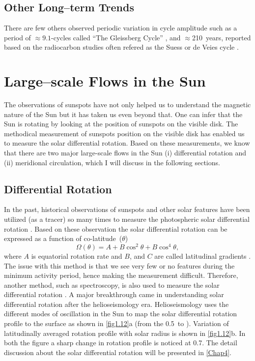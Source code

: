 \subsection{Other Long--term Trends}
There are few others observed periodic variation in cycle amplitude such as a period of $\approx9.1$-cycles called ``The Gleissberg Cycle'' \citep{Gleissberg1939, Hathaway2015, Usoskin2013}, and $\approx$210~years, reported based on the radiocarbon studies often refered as the Suess or de Veies cycle \citep{Suess1980}.


\section{Large--scale Flows in the Sun}
\label{ch1-largemotion}
The observations of sunspots have not only helped us to understand the magnetic nature of the Sun but it has taken us even beyond that. One can infer that the Sun is rotating by looking at the position of sunspots on the visible disk. The methodical measurement of sunspots position on the visible disk has enabled us to measure the solar differential rotation. Based on these measurements, we know that there are two major large\hyp scale flows in the Sun (i) differential rotation and (ii) meridional circulation, which I will discuss in the following sections.

\subsection{Differential Rotation}
\label{s-differential}

In the past, historical observations of sunspots and other solar features have been utilized (as a tracer) so many times to measure the photospheric solar differential rotation \citep[see a review by][and references therein]{Beck2000}. Based on these observation the solar differential rotation can be expressed as a function of co-latitude~($\theta$)
%
\begin{equation}
    \Omega(\theta) = A+B\cos^2{\theta}+B\cos^4{\theta},
    \label{eq1.3}
\end{equation}
%
where $A$ is equatorial rotation rate and $B$, and $C$ are called latitudinal gradients \citep[and reference therein]{Beck2000}. The issue with this method is that we see very few or no features during the minimum activity period, hence making the measurement difficult. Therefore, another method, such as spectroscopy, is also used to measure the solar differential rotation \citep{Howard1970}. A major breakthrough came in understanding solar differential rotation after the helioseismology era. Helioseismology uses the different modes of oscillation in the Sun to map the solar differential rotation profile to the surface as shown in \autoref{fig1.12}a (from the 0.5\Rsun\ to \Rsun). Variation of latitudinally averaged rotation profile with solar radius is shown in \autoref{fig1.12}b. In both the figure a sharp change in rotation profile is noticed at 0.7\Rsun. The detail discussion about the solar differential rotation will be presented in \cref{Chap4}. 



